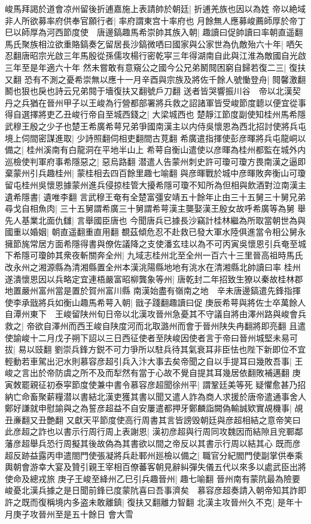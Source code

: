 峻馬拜謁於道會凉州留後折逋嘉施上表請帥於朝廷|{
	折逋羌族也因以為姓}
帝以絶域非人所欲募率府供奉官願行者|{
	率府謂東宫十率府也}
月餘無人應募峻薦師厚於帝丁巳以師厚為河西節度使　唐邊鎬趣馬希崇帥其族入朝|{
	趣讀曰促帥讀曰率朝直遥翻}
馬氏聚族相泣欲重賂鎬奏乞留居長沙鎬微哂曰國家與公家世為仇敵殆六十年|{
	哂矢忍翻唐昭宗光啟三年馬殷從孫儒攻楊行密乾寜三年得湖南自此與江淮為敵國自光啟三年至是年適六十年}
然未嘗敢有意窺公之國今公兄弟鬭䦧困窮自歸若復二三|{
	復扶又翻}
恐有不測之憂希崇無以應十一月辛酉與宗族及將佐千餘人號慟登舟|{
	䦧馨激翻鬭也狠也戾也詩云兄弟䦧于墻復扶又翻號戶刀翻}
送者皆哭響振川谷　帝以北漢契丹之兵猶在晉州甲子以王峻為行營都部署將兵救之詔諸軍皆受峻節度聼以便宜從事得自選擇將吏乙丑峻行帝自至城西錢之|{
	大梁城西也}
楚靜江節度副使知桂州馬希隱武穆王殷之少子也楚王希廣希萼兄弟爭國南漢主以内侍吳懷恩為西北招討使將兵屯境上伺間密謀進取|{
	少詩照翻伺相吏翻間古莧翻}
希廣遣指揮使彭彦暉將兵屯龍峒以備之|{
	桂州溪南有白龍洞在平地半山上}
希萼自衡山遣使以彦暉為桂州都監在城外内巡檢使判軍府事希隱惡之|{
	惡烏路翻}
潜遣人告蒙州刺史許可瓊可瓊方畏南漢之逼即棄蒙州引兵趣桂州|{
	蒙桂相去四百餘里趣七喻翻}
與彦暉戰於城中彦暉敗奔衡山可瓊留屯桂州吳懷恩據蒙州進兵侵掠桂管大擾希隱可瓊不知所為但相與飲酒對泣南漢主遺希隱書|{
	遺唯李翻}
言武穆王奄有全楚富彊安靖五十餘年止由三十五舅三十舅兄弟尋戈自相魚肉|{
	三十五舅謂希廣三十舅謂希萼漢主龑娶漢王殷女故呼希廣等為舅}
舉先人基業北面仇讎|{
	言舉國臣唐也}
今聞唐兵已據長沙竊計桂林繼為所取當朝世為與國重以婚姻|{
	朝直遥翻重直用翻}
覩茲傾危忍不赴救已發大軍水陸俱進當令相公舅永擁節旄常居方面希隱得書與僚佐議降之支使潘玄珪以為不可丙寅吳懷恩引兵奄至城下希隱可瓊帥其衆夜斬關奔全州|{
	九域志桂州北至全州一百六十三里晉高祖時馬氏改永州之湘源縣為清湘縣置全州本漢洮陽縣地地有洮水在清湘縣北帥讀曰率}
桂州遂潰懷恩因以兵略定宜連梧嚴富昭柳龔象等州|{
	唐乾封二年招致生獠以秦故桂林郡地置嚴州富州當是置於賀州富川縣}
南漢始盡有嶺南之地　辛未唐邊鎬遣先鋒指揮使李承戩將兵如衡山趣馬希萼入朝|{
	戩子踐翻趣讀曰促}
庚辰希萼與將佐士卒萬餘人自潭州東下　王峻留陕州旬日帝以北漢攻晉州急憂其不守議自將由澤州路與峻會兵救之|{
	帝欲自澤州而西王峻自陕度河而北取潞州而會于晉州陕失冉翻將即亮翻}
且遣使諭峻十二月戊子朔下詔以三日西征使者至陕峻因使者言于帝曰晉州城堅未易可拔|{
	易以豉翻}
劉崇兵鋒方鋭不可力爭所以駐兵待其氣衰耳非臣怯也陛下新即位不宜輕動若車駕出汜水則慕容彦超引兵入汴大事去矣帝聞之自以手提耳曰幾敗吾事|{
	王峻之言出於帝防虞之所不及而犁然有當于心故不覺自提其耳幾居依翻敗補邁翻}
庚寅敇罷親征初泰寜節度使兼中書令慕容彦超聞徐州平|{
	謂鞏廷美等死}
疑懼愈甚乃招納亡命畜聚薪糧潜以書結北漢吏獲其書以聞又遣人詐為商人求援於唐帝遣通事舍人鄭好謙就申慰諭與之為誓彦超益不自安屢遣都押牙鄭麟詣闕偽輸誠欵實覘機事|{
	覘丑亷翻又丑艶翻}
又獻天平節度使高行周書其言皆謗毁朝廷與彦超相結之意帝笑曰此彦超之詐也以書示行周行周上表謝恩|{
	漢初彦超與行周同攻魏因而結隙且兖鄆鄰藩彦超舉兵恐行周擬其後故偽為其書欲以間之帝反以其書示行周以結其心}
既而彦超反跡益露丙申遣閤門使張凝將兵赴鄆州廵檢以備之|{
	職官分紀閻門使副掌供奉乘輿朝會游幸大宴及贊引親王宰相百僚蕃客朝見辭糾彈失儀五代以來多以處武臣出將使命及總戎旅}
庚子王峻至絳州乙巳引兵趣晉州|{
	趣七喻翻}
晉州南有蒙阬最為險要峻憂北漢兵據之是日聞前鋒已度蒙阬喜曰吾事濟矣　慕容彦超奏請入朝帝知其詐即許之既而復稱境内多盗未敢離鎮|{
	復扶又翻離力智翻}
北漢主攻晉州久不克|{
	是年十月庚子攻晉州至是五十餘日}
會大雪

